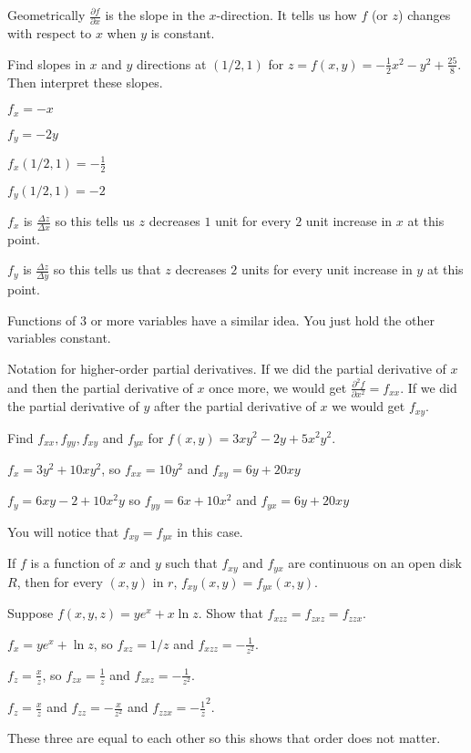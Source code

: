 \documentclass[../calc3.tex]{subfiles}
\begin{document}
Geometrically $\frac{\partial f}{\partial x}$ is the slope in the $x$-direction. It tells us how $f$ (or $z$) changes with respect to $x$ when $y$ is constant.

\begin{example}
    Find slopes in $x$ and $y$ directions at $(1/2, 1)$ for $z=f(x,y)=-\frac{1}{2}x^2-y^2+\frac{25}{8}$. Then interpret these slopes.

    $f_x=-x$

    $f_y=-2y$

    $f_x(1/2,1)=-\frac{1}{2}$

    $f_y(1/2,1)=-2$

    $f_x$ is $\frac{\Delta z}{\Delta x}$ so this tells us $z$ decreases $1$ unit for every $2$ unit increase in $x$ at this point.

    $f_y$ is $\frac{\Delta z}{\Delta y}$ so this tells us that $z$ decreases $2$ units for every unit increase in $y$ at this point.
\end{example}

Functions of $3$ or more variables have a similar idea. You just hold the other variables constant.

Notation for higher-order partial derivatives. If we did the partial derivative of $x$ and then the partial derivative of $x$ once more, we would get $\frac{\partial^2 f}{\partial x^2}=f_{xx}$. If we did the partial derivative of $y$ after the partial derivative of $x$ we would get $f_{xy}$.

\begin{example}
    Find $f_{xx}, f_{yy}, f_{xy}$ and $f_{yx}$ for $f(x,y)=3xy^2-2y+5x^2y^2$.

    $f_x = 3y^2+10xy^2$, so $f_{xx}=10y^2$ and $f_{xy}=6y+20xy$

    $f_y=6xy-2+10x^2y$ so $f_{yy}=6x+10x^2$ and $f_{yx}=6y+20xy$

    You will notice that $f_{xy}=f_{yx}$ in this case.
\end{example}

\begin{theorem}
    If $f$ is a function of $x$ and $y$ such that $f_{xy}$ and $f_{yx}$ are continuous on an open disk $R$, then for every $(x,y)$ in $r$, $f_{xy}(x,y)=f_{yx}(x,y)$.
\end{theorem}

\pagebreak
\begin{example}
    Suppose $f(x,y,z)=ye^x+x\ln z$. Show that $f_{xzz}=f_{zxz}=f_{zzx}$.

    $f_x=ye^x+\ln z$, so $f_{xz}=1/z$ and $f_{xzz}=-\frac{1}{z^2}$.

    $f_z = \frac{x}{z}$, so $f_{zx}=\frac{1}{z}$ and $f_{zxz}=-\frac{1}{z^2}$.

    $f_z=\frac{x}{z}$ and $f_{zz}=-\frac{x}{z^2}$ and $f_{zzx}=-\frac{1}{z}^2$.

    These three are equal to each other so this shows that order does not matter.
\end{example}
\end{document}

